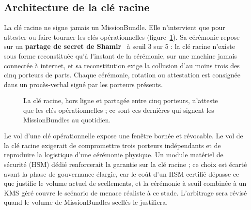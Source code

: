 \documentclass[11pt,a4paper]{article}
\begin{document}
\subsection{Architecture de la clé racine}\label{sec:racine}

La clé racine ne signe jamais un MissionBundle. Elle n'intervient que pour attester ou faire tourner les clés opérationnelles (figure~\ref{fig:rootkey}). Sa cérémonie repose sur un \textbf{partage de secret de Shamir}~\cite{shamir1979} à seuil 3 sur 5 : la clé racine n'existe sous forme reconstituée qu'à l'instant de la cérémonie, sur une machine jamais connectée à internet, et sa reconstitution exige la collusion d'au moins trois des cinq porteurs de parts. Chaque cérémonie, rotation ou attestation est consignée dans un procès-verbal signé par les porteurs présents.

\begin{figure}[H]\centering
{}
\caption{La clé racine, hors ligne et partagée entre cinq porteurs, n'atteste que les clés opérationnelles ; ce sont ces dernières qui signent les MissionBundles au quotidien.}\label{fig:rootkey}
\end{figure}

Le vol d'une clé opérationnelle expose une fenêtre bornée et révocable. Le vol de la clé racine exigerait de compromettre trois porteurs indépendants et de reproduire la logistique d'une cérémonie physique. Un module matériel de sécurité (HSM) dédié renforcerait la garantie sur la clé racine ; ce choix est écarté avant la phase de gouvernance élargie, car le coût d'un HSM certifié dépasse ce que justifie le volume actuel de scellements, et la cérémonie à seuil combinée à un KMS géré couvre le scénario de menace réaliste à ce stade. L'arbitrage sera révisé quand le volume de MissionBundles scellés le justifiera.
\end{document}
